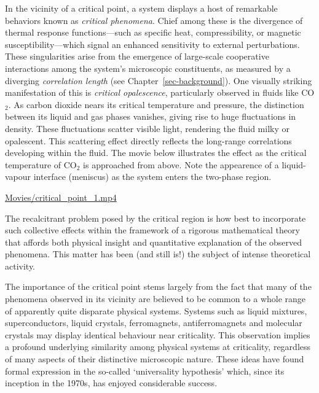 \documentclass[
  letterpaper,
  DIV=11,
  numbers=noendperiod]{scrreprt}
\begin{document}
In the vicinity of a critical point, a system displays a host of
remarkable behaviors known as \emph{critical phenomena}. Chief among
these is the divergence of thermal response functions---such as specific
heat, compressibility, or magnetic susceptibility---which signal an
enhanced sensitivity to external perturbations. These singularities
arise from the emergence of large-scale cooperative interactions among
the system's microscopic constituents, as measured by a diverging
\emph{correlation length} (see Chapter~\ref{sec-background}). One
visually striking manifestation of this is \emph{critical opalescence},
particularly observed in fluids like CO\(_2\). As carbon dioxide nears
its critical temperature and pressure, the distinction between its
liquid and gas phases vanishes, giving rise to huge fluctuations in
density. These fluctuations scatter visible light, rendering the fluid
milky or opalescent. This scattering effect directly reflects the
long-range correlations developing within the fluid. The movie below
illustrates the effect as the critical temperature of CO\(_2\) is
approached from above. Note the appearence of a liquid-vapour interface
(meniscus) as the system enters the two-phase region.

\url{Movies/critical_point_1.mp4}

The recalcitrant problem posed by the critical region is how best to
incorporate such collective effects within the framework of a rigorous
mathematical theory that affords both physical insight and quantitative
explanation of the observed phenomena. This matter has been (and still
is!) the subject of intense theoretical activity.

The importance of the critical point stems largely from the fact that
many of the phenomena observed in its vicinity are believed to be common
to a whole range of apparently quite disparate physical systems. Systems
such as liquid mixtures, superconductors, liquid crystals, ferromagnets,
antiferromagnets and molecular crystals may display identical behaviour
near criticality. This observation implies a profound underlying
similarity among physical systems at criticality, regardless of many
aspects of their distinctive microscopic nature. These ideas have found
formal expression in the so-called `universality hypothesis' which,
since its inception in the 1970s, has enjoyed considerable success.
\end{document}
